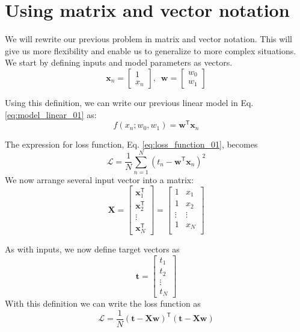 \documentclass[b5paper,12pt]{article} %
\begin{document}
\section{Using matrix and vector notation}

We will rewrite our previous problem in matrix and vector notation. This will
give us more flexibility and enable us to generalize to more complex situations.
We start by defining inputs and model parameters as vectors.
\begin{equation*}
\mathbf{x}_{n} = \begin{bmatrix}
1 \\
x_{n}
\end{bmatrix}
,\,\,\,%
\mathbf{w} = \begin{bmatrix}
w_{0} \\
w_{1}
\end{bmatrix}
\end{equation*}

Using this definition, we can write our previous linear model in Eq.
\eqref{eq:model_linear_01} as:
\begin{equation}
f(x_n; w_0, w_1) = \mathbf{w}^{\mathsf{T}} \mathbf{x}_{n}
\label{eq:model_linear_02}
\end{equation}

The expression for loss function, Eq. \eqref{eq:loss_function_01}, becomes
\begin{equation}
\mathcal{L} = \frac{1}{N} \sum_{n=1}^{N} \left( t_{n} - \mathbf{w}^{\mathsf{T}}
\mathbf{x}_{n} \right)^2
\label{eq:loss_function_02}
\end{equation}
%
We now arrange several input vector into a matrix:
%
\begin{equation*}
\mathbf{X} = \begin{bmatrix}
\mathbf{x}^{\mathsf{T}}_{1} \\
\mathbf{x}^{\mathsf{T}}_{2} \\
\vdots \\
\mathbf{x}^{\mathsf{T}}_{N}
\end{bmatrix} =
\begin{bmatrix}
1 & x_{1} \\
1 & x_{2} \\
\vdots & \vdots \\
1 & x_{N} \\
\end{bmatrix}
\end{equation*}

As with inputs, we now define target vectors as
\begin{equation}
\mathbf{t} = \begin{bmatrix}
t_1 \\
t_2 \\
\vdots \\
t_N
\end{bmatrix}
\end{equation}
%
With this definition we can write the loss function as
\begin{equation}
\mathcal{L} = \frac{1}{N} \left( \mathbf{t} - \mathbf{Xw} \right)^{\mathsf{T}}
\left( \mathbf{t} - \mathbf{Xw} \right)
\end{equation}
\end{document}
